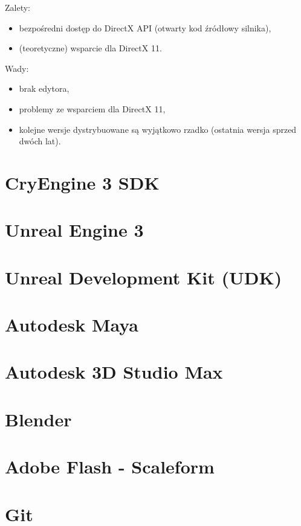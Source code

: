 Zalety:
\begin{itemize}
\item bezpośredni dostęp do DirectX API (otwarty kod źródłowy silnika),
\item (teoretyczne) wsparcie dla DirectX 11.
\end{itemize}

Wady:
\begin{itemize}
\item brak edytora,
\item problemy ze wsparciem dla DirectX 11,
\item kolejne wersje dystrybuowane są wyjątkowo rzadko (ostatnia wersja sprzed dwóch lat).
\end{itemize}

\section{CryEngine 3 SDK}

\section{Unreal Engine 3}

\section{Unreal Development Kit (UDK)}

\section{Autodesk Maya}

\section{Autodesk 3D Studio Max}

\section{Blender}

\section{Adobe Flash - Scaleform}

\section{Git}

